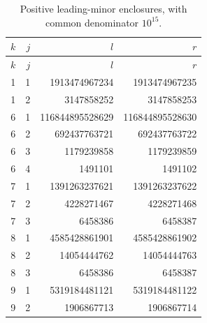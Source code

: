 \begin{longtable}{@{}rrrr@{}}
\caption{Positive leading-minor enclosures, with common denominator $10^{15}$.}\label{tab:minors}\\
\toprule $k$&$j$&$l$&$r$\\\midrule\endfirsthead
\toprule $k$&$j$&$l$&$r$\\\midrule\endhead
1 & 1 & 1913474967234 & 1913474967235 \\
1 & 2 & 3147858252 & 3147858253 \\
6 & 1 & 116844895528629 & 116844895528630 \\
6 & 2 & 692437763721 & 692437763722 \\
6 & 3 & 1179239858 & 1179239859 \\
6 & 4 & 1491101 & 1491102 \\
7 & 1 & 1391263237621 & 1391263237622 \\
7 & 2 & 4228271467 & 4228271468 \\
7 & 3 & 6458386 & 6458387 \\
8 & 1 & 4585428861901 & 4585428861902 \\
8 & 2 & 14054444762 & 14054444763 \\
8 & 3 & 6458386 & 6458387 \\
9 & 1 & 5319184481121 & 5319184481122 \\
9 & 2 & 1906867713 & 1906867714 \\
\bottomrule
\end{longtable}
